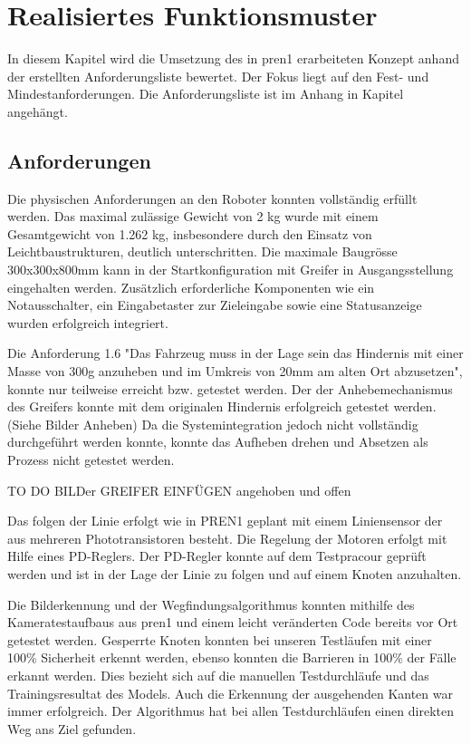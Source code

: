 \section{Realisiertes Funktionsmuster}

In diesem Kapitel wird die Umsetzung des in \acrshort{pren1} erarbeiteten Konzept anhand der  erstellten Anforderungsliste bewertet. Der Fokus liegt auf den Fest- und Mindestanforderungen. Die Anforderungsliste ist im Anhang in Kapitel  angehängt.

\subsection{Anforderungen}

Die physischen Anforderungen an den Roboter konnten vollständig erfüllt werden. Das maximal zulässige Gewicht von 2 kg wurde mit einem Gesamtgewicht von 1.262 kg, insbesondere durch den Einsatz von Leichtbaustrukturen, deutlich unterschritten. Die maximale Baugrösse 300x300x800mm kann in der Startkonfiguration mit Greifer in Ausgangsstellung eingehalten werden. Zusätzlich erforderliche Komponenten wie ein Notausschalter, ein Eingabetaster zur Zieleingabe sowie eine Statusanzeige wurden erfolgreich integriert.

Die Anforderung 1.6 "Das Fahrzeug muss in der Lage sein das Hindernis mit  einer Masse von 300g anzuheben und im Umkreis von 20mm am alten Ort abzusetzen", konnte nur teilweise erreicht bzw. getestet werden. Der der Anhebemechanismus des Greifers konnte mit dem originalen Hindernis erfolgreich getestet werden. (Siehe Bilder Anheben) Da die Systemintegration jedoch nicht vollständig durchgeführt werden konnte, konnte das Aufheben drehen und Absetzen als Prozess nicht getestet werden.

TO DO BILDer GREIFER EINFÜGEN angehoben und offen

Das folgen der Linie erfolgt wie in PREN1 geplant mit einem Liniensensor der aus mehreren Phototransistoren besteht. Die Regelung der Motoren erfolgt mit Hilfe eines PD-Reglers. Der PD-Regler konnte auf dem Testpracour geprüft werden und ist in der Lage der Linie zu folgen und auf einem Knoten anzuhalten. 

Die Bilderkennung und der Wegfindungsalgorithmus  konnten mithilfe des Kameratestaufbaus aus \acrshort{pren1} und einem leicht veränderten Code bereits vor Ort getestet werden. Gesperrte Knoten konnten bei unseren Testläufen mit einer 100\% Sicherheit erkennt werden, ebenso konnten die Barrieren in 100\% der Fälle erkannt werden. Dies bezieht sich auf die manuellen Testdurchläufe und das Trainingsresultat des Models. Auch die Erkennung der ausgehenden Kanten war immer erfolgreich. Der Algorithmus hat bei allen Testdurchläufen einen direkten Weg ans Ziel gefunden. 

